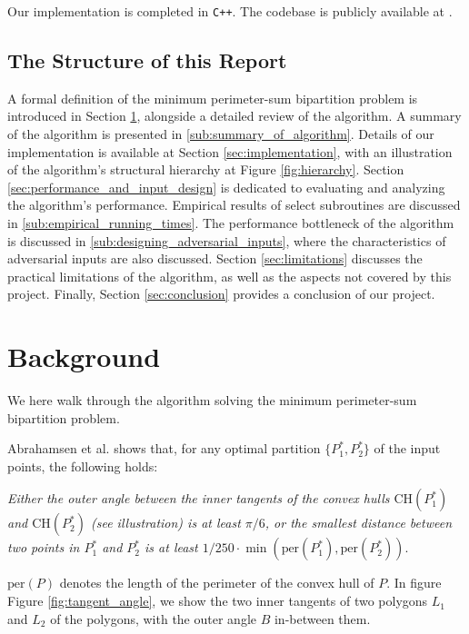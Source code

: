 \documentclass{article}
\newcommand{\figref}[1]{Figure \ref{#1}}
\newcommand{\secref}[1]{Section \ref{#1}}
\begin{document}
Our implementation is completed in \texttt{C++}. The codebase is publicly available at \cite{hm18}.

\subsection{The Structure of this Report}

A formal definition of the minimum perimeter-sum bipartition problem is introduced in \secref{sec:background}, alongside a detailed review of the algorithm. A summary of the algorithm is presented in \ref{sub:summary_of_algorithm}. Details of our implementation is available at \secref{sec:implementation}, with an illustration of the algorithm's structural hierarchy at \figref{fig:hierarchy}. \secref{sec:performance_and_input_design} is dedicated to evaluating and analyzing the algorithm's performance. Empirical results of select subroutines are discussed in \ref{sub:empirical_running_times}. The performance bottleneck of the algorithm is discussed in \ref{sub:designing_adversarial_inputs}, where the characteristics of adversarial inputs are also discussed. \secref{sec:limitations} discusses the practical limitations of the algorithm, as well as the aspects not covered by this project. Finally, \secref{sec:conclusion} provides a conclusion of our project.

\section{Background} \label{sec:background}


We here walk through the algorithm solving the minimum perimeter-sum bipartition problem.

Abrahamsen et al. \cite{abb17} shows that, for any optimal partition $\{P_1^*, P_2^*\}$ of the input points, the following holds:

\textit{Either the outer angle between the inner tangents of the convex hulls
$\text{CH}(P_1^*)$ and $\text{CH}(P_2^*)$ (see illustration) is at least $\pi / 6$, or the smallest distance between two
points in $P_1^*$ and $P_2^*$ is at least $1/250 \cdot \min(\text{per}(P_1^*), \text{per}(P_2^*))$}. 

$\text{per}(P)$ denotes the length of the perimeter of the convex hull of $P$. In figure \figref{fig:tangent_angle}, we show the two inner tangents of two polygons $L_1$ and $L_2$ of the polygons, with the outer angle $B$ in-between them.
\end{document}
